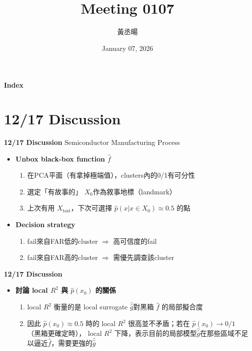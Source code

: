 \documentclass[12pt,aspectratio=43]{beamer}
\title{Meeting 0107}
\author{黃丞暘}
\institute{國立東華大學應數統計所}
\date{January 07, 2026}
\begin{document}
\begin{frame}
  \titlepage
\end{frame}

\begin{frame}{\textbf{Index}}
  \tableofcontents
\end{frame}

\section{12/17 Discussion}

\begin{frame}{\textbf{12/17 Discussion}}
\linespread{1.5}
Semiconductor Manufacturing Process

  \begin{itemize}
    \item \textbf{Unbox black-box function $\hat f$}
    \begin{enumerate}[]
      \item 在PCA平面（有拿掉極端值），clusters內的0/1有可分性  
      \item 選定「有故事的」 $X_0$作為敘事地標（landmark）
      \item 上次有用 $X_{\text{test}}$，下次可選擇 $\hat p(x|x \in X_0)\approx 0.5$ 的點
    \end{enumerate}

    \item \textbf{Decision strategy}
    \begin{enumerate}[]
      \item fail來自FAR低的cluster $\Rightarrow$ 高可信度的fail
      \item fail來自FAR高的cluster $\Rightarrow$ 需優先調查該cluster
    \end{enumerate}
  \end{itemize}
\end{frame}

\begin{frame}{\textbf{12/17 Discussion}}
\linespread{1.5}

\begin{itemize}
  \item \textbf{討論 local $R^2$ 與 $\hat p(x_0)$ 的關係}
  \begin{enumerate}[]
    \item local $R^2$ 衡量的是 local surrogate $\hat{\hat{g}}$對黑箱 $\hat f$ 的局部擬合度
    \item 因此 $\hat p(x_0)\approx 0.5$ 時的 local $R^2$ 很高並不矛盾；若在 $\hat p(x_0)\to 0/1$ （黑箱更確定時）， local $R^2$ 下降，表示目前的局部模型$\hat{\hat{g}}$在那些區域不足以逼近$\hat{f}$，需要更強的$\hat{\hat{g}}$
  \end{enumerate}
\end{itemize}

\end{frame}
\end{document}
